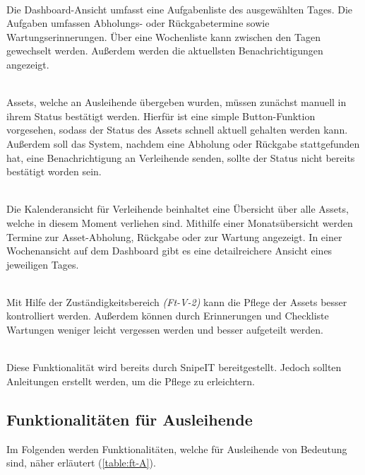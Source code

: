 {\sffamily\color{maincolor}{Ft-V-1 | Dashboard }}\\
Die Dashboard-Ansicht umfasst eine Aufgabenliste des ausgewählten Tages. Die
Aufgaben umfassen Abholungs- oder Rückgabetermine sowie Wartungserinnerungen.
Über eine Wochenliste kann zwischen den Tagen gewechselt werden. Außerdem werden
die aktuellsten Benachrichtigungen angezeigt.

    {\sffamily\color{maincolor}{Ft-V-2 | Bearbeiten des Assetstatus }}\\
Assets, welche an Ausleihende übergeben wurden, müssen zunächst manuell in ihrem
Status bestätigt werden. Hierfür ist eine simple Button-Funktion vorgesehen,
sodass der Status des Assets schnell aktuell gehalten werden kann. Außerdem soll
das System, nachdem eine Abholung oder Rückgabe stattgefunden hat, eine
Benachrichtigung an Verleihende senden, sollte der Status nicht bereits
bestätigt worden sein.

    {\sffamily\color{maincolor}{Ft-B-4 | Kalenderansicht für Verleihende}}\\
Die Kalenderansicht für Verleihende beinhaltet eine Übersicht über alle Assets,
welche in diesem Moment verliehen sind. Mithilfe einer Monatsübersicht werden
Termine zur Asset-Abholung, Rückgabe oder zur Wartung angezeigt. In einer
Wochenansicht auf dem Dashboard gibt es eine detailreichere Ansicht eines
jeweiligen Tages.


    {\sffamily\color{maincolor}{Ft-V-3 | Pflege von Assets   }}\\
Mit Hilfe der Zuständigkeitsbereich \textit{(Ft-V-2)} kann die Pflege der Assets
besser kontrolliert werden. Außerdem können durch Erinnerungen und Checkliste
Wartungen weniger leicht vergessen werden und besser aufgeteilt werden.


    {\sffamily\color{maincolor}{Ft-V-4 | Pflege der Datenbank }}\\
Diese Funktionalität wird bereits durch SnipeIT bereitgestellt. Jedoch sollten
Anleitungen erstellt werden, um die Pflege zu erleichtern. 

\subsection{Funktionalitäten für Ausleihende}
Im Folgenden werden Funktionalitäten, welche für Ausleihende von Bedeutung sind,
näher erläutert (\ref{table:ft-A}).

